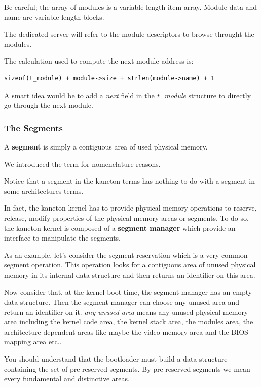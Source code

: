 Be  careful;  the   array  of  modules  is  a   variable  length  item
array. Module data and name are variable length blocks.

The dedicated server will refer to the module descriptors to browse
throught the modules.

The calculation used to compute the next module address is:

\begin{verbatim}
sizeof(t_module) + module->size + strlen(module->name) + 1
\end{verbatim}

A smart idea would be to add a \textit{next} field in the \textit{t\_module}
structure to directly go through the next module.

\subsubsection{The Segments}

A \textbf{segment} is simply a contiguous area of used physical memory.

We introduced the term for nomenclature reasons.

Notice that a segment in the kaneton terms has nothing to do with
a segment in some architectures terms.

In fact, the kaneton kernel has to provide physical memory operations to
reserve, release, modify properties of the physical memory areas or segments.
To do so, the kaneton kernel is composed of a \textbf{segment manager} which
provide an interface to manipulate the segments.

As an example, let's consider the segment reservation which is a very
common segment operation. This operation looks for a contiguous area
of unused physical memory in its internal data structure and then
returns an identifier on this area.

Now consider that, at the kernel boot time, the segment manager has
an empty data structure. Then the segment manager can choose any
unused area and return an identifier on it. \textit{any unused area} means
any unused physical memory area including the kernel code area, the kernel
stack area, the modules area, the architecture dependent areas like maybe the
video memory area and the BIOS mapping area etc..

You should understand that the bootloader must build a data structure
containing the set of pre-reserved segments. By pre-reserved segments we
mean every fundamental and distinctive areas.

